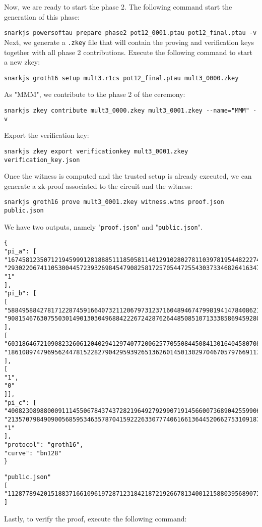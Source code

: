 \documentclass[a4paper,oneside,12pt]{book}
\begin{document}
\noindent Now, we are ready to start the phase 2. The following command start the generation of this phase:


\verb|snarkjs powersoftau prepare phase2 pot12_0001.ptau pot12_final.ptau -v|
\newpage
\noindent Next, we generate a \verb|.zkey| file that will contain the proving and verification keys together with all phase 2 contributions. Execute the following command to start a new zkey:

\verb|snarkjs groth16 setup mult3.r1cs pot12_final.ptau mult3_0000.zkey|

\noindent As "MMM", we contribute to the phase 2 of the ceremony:

\verb|snarkjs zkey contribute mult3_0000.zkey mult3_0001.zkey --name="MMM" -v|

\noindent Export the verification key:

\verb|snarkjs zkey export verificationkey mult3_0001.zkey verification_key.json|

\noindent Once the witness is computed and the trusted setup is already executed, we can generate a zk-proof associated to the circuit and the witness:

\verb|snarkjs groth16 prove mult3_0001.zkey witness.wtns proof.json public.json|

\noindent We have two outputs, namely "\verb|proof.json|" and "\verb|public.json|".

\begin{verbatim}
{
"pi_a": [
"16745812350712194599912818885111850581140129102802781103978195448222742721982",
"2930220674110530044572393269845479082581725705447255430373346826416347319433",
"1"
],
"pi_b": [
[
"5884958842781712287459166407321120679731237160489467479981941478408621125291",
"908154676307550301490130304968842226724287626448508510713338586945928079132"
],
[
"6031864672109082326061204029412974077200625770550844508413016404580708499805",
"18610897479695624478152282790429593926513626014501302970467057976691179455214"
],
[
"1",
"0"
]],
"pi_c": [
"4008230898800091114550678437437282196492792990719145660073689042559906893420",
"21357079849090056859534635787041592226330777406166136445206627531091878143647",
"1"
],
"protocol": "groth16",
"curve": "bn128"
}
\end{verbatim}

\begin{verbatim}
"public.json"
[
"11287789420151883716610961972871231842187219266781340012158803956890733917065"
]
\end{verbatim}
\noindent Lastly, to verify the proof, execute the following command:
\end{document}
